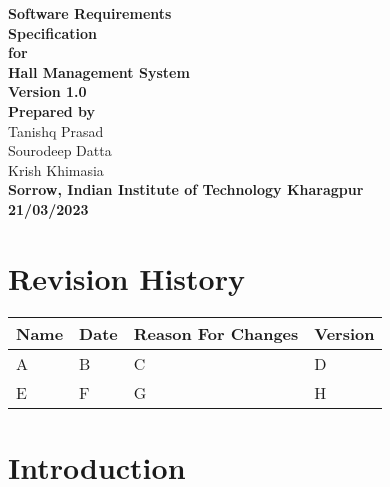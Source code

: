 \documentclass[letterpaper,12pt]{article}
\begin{document}
\vspace*{\fill}
\begin{flushright}
    \textbf{
        \Huge{Software Requirements \\ Specification} \\ \vspace{30pt} 
        \LARGE{for} \\ \vspace{30pt}
        \Huge{Hall Management System} \\ \vspace{30pt}
        \Large{Version 1.0} \\ \vspace{30pt}
        \Large{Prepared by}
    } \\ \vspace{10pt}
    \large{Tanishq Prasad \\ Sourodeep Datta \\ Krish Khimasia} \\ \vspace{30pt}
    \textbf{
        \Large{Sorrow, Indian Institute of Technology Kharagpur} \\ \vspace{30pt}
        \large{21/03/2023}
    }
\end{flushright}
\vspace*{\fill}
\pagebreak

\renewcommand*\contentsname{\Huge Table of Contents}
\small\tableofcontents
\pagebreak

\section*{\LARGE Revision History}
    \begin{center}
        \begin{tabular}{| p{2cm} | p{2cm} | p{5cm} | p{2cm} |}
            \hline			
            \textbf{Name} & \textbf{Date} & \textbf{Reason For Changes} & \textbf{Version} \\
            \hline \hline
            A & B & C & D \\
            \hline
            E & F & G & H \\
            \hline
        \end{tabular}
    \end{center}

\section{\LARGE Introduction}
\end{document}
